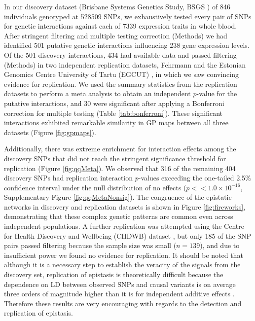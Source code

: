 \documentclass{article}
\begin{document}
In our discovery dataset (Brisbane Systems Genetics Study, BSGS \cite{Powell2012}) of 846 individuals genotyped at 528509 SNPs, we exhaustively tested every pair of SNPs for genetic interactions against each of 7339 expression traits in whole blood. After stringent filtering and multiple testing correction (Methods) we had identified 501 putative genetic interactions influencing 238 gene expression levels. Of the 501 discovery interactions, 434 had available data and passed filtering (Methods) in two independent replication datasets, Fehrmann \cite{Fehrmann2011} and the Estonian Genomics Centre University of Tartu (EGCUT) \cite{Metspalu2004}, in which we saw convincing evidence for replication. We used the summary statistics from the replication datasets to perform a meta analysis to obtain an independent $p$-value for the putative interactions, and 30 were significant after applying a Bonferroni correction for multiple testing (Table \ref{tab:bonferroni}). These significant interactions exhibited remarkable similarity in GP maps between all three datasets (Figure \ref{fig:gpmaps}).

Additionally, there was extreme enrichment for interaction effects among the discovery SNPs that did not reach the stringent significance threshold for replication (Figure \ref{fig:qqMeta}). We observed that 316 of the remaining 404 discovery SNPs had replication interaction $p$-values exceeding the one-tailed 2.5\% confidence interval under the null distribution of no effects ($p << 1.0 \times 10^{-16}$, Supplementary Figure \ref{fig:qqMetaNonsig}). The congruence of the epistatic networks in discovery and replication datasets is shown in Figure \ref{fig:fireworks}, demonstrating that these complex genetic patterns are common even across independent populations. A further replication was attempted using the Centre for Health Discovery and Wellbeing (CHDWB) dataset \cite{Preininger2013}, but only 185 of the SNP pairs passed filtering because the sample size was small ($n=139$), and due to insufficient power we found no evidence for replication. It should be noted that although it is a necessary step to establish the veracity of the signals from the discovery set, replication of epistasis is theoretically difficult because the dependence on LD between observed SNPs and causal variants is on average three orders of magnitude higher than it is for independent additive effects \cite{Weir2008, Hemani2013}. Therefore these results are very encouraging with regards to the detection and replication of epistasis.
\end{document}
